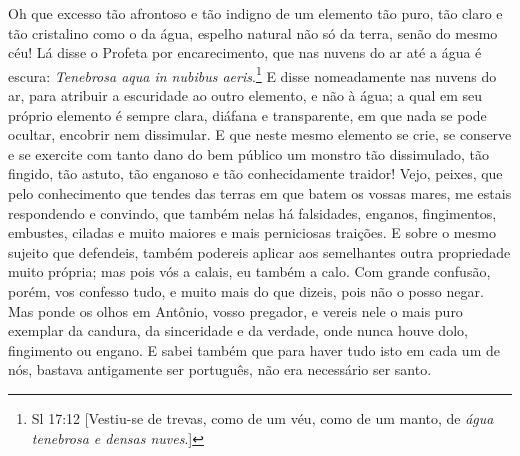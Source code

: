 Oh que excesso tão afrontoso e tão indigno de um elemento tão puro, tão
claro e tão cristalino como o da água, espelho natural não só da terra,
senão do mesmo céu! Lá disse o Profeta por encarecimento, que nas
nuvens do ar até a água é escura: \emph{Tenebrosa aqua in nubibus
aeris}.\footnote{Sl 17:12 [Vestiu-se de trevas, como de um véu, como de um manto, de \emph{água tenebrosa e densas nuves}.]} E disse nomeadamente nas nuvens do ar, para atribuir a
escuridade ao outro elemento, e não à água; a qual em seu próprio
elemento é sempre clara, diáfana e transparente, em que nada se pode
ocultar, encobrir nem dissimular. E que neste mesmo elemento se crie, se
conserve e se exercite com tanto dano do bem público um monstro tão
dissimulado, tão fingido, tão astuto, tão enganoso e tão conhecidamente
traidor!
Vejo, peixes, que pelo conhecimento que tendes das terras em que batem
os vossas mares, me estais respondendo e convindo, que também nelas há
falsidades, enganos, fingimentos, embustes, ciladas e muito maiores e
mais perniciosas traições. E sobre o mesmo sujeito que defendeis, também
podereis aplicar aos semelhantes outra propriedade muito própria; mas
pois vós a calais, eu também a calo. Com grande confusão, porém, vos
confesso tudo, e muito mais do que dizeis, pois não o posso negar. Mas
ponde os olhos em Antônio, vosso pregador, e vereis nele o mais puro
exemplar da candura, da sinceridade e da verdade, onde nunca houve dolo,
fingimento ou engano. E sabei também que para haver tudo isto em cada um
de nós, bastava antigamente ser português, não era necessário ser santo.

